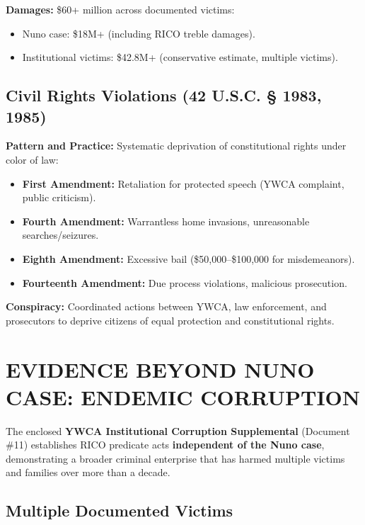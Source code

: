 \documentclass[12pt,oneside]{article}
\begin{document}
\begin{flushleft}
\textbf{Damages:} \$60+ million across documented victims:

\begin{itemize}
\item Nuno case: \$18M+ (including RICO treble damages).
\item Institutional victims: \$42.8M+ (conservative estimate, multiple victims).
\end{itemize}

\subsection*{Civil Rights Violations (42 U.S.C. § 1983, 1985)}

\textbf{Pattern and Practice:} Systematic deprivation of constitutional rights under color of law:

\begin{itemize}
\item \textbf{First Amendment:} Retaliation for protected speech (YWCA complaint, public criticism).
\item \textbf{Fourth Amendment:} Warrantless home invasions, unreasonable searches/seizures.
\item \textbf{Eighth Amendment:} Excessive bail (\$50,000--\$100,000 for misdemeanors).
\item \textbf{Fourteenth Amendment:} Due process violations, malicious prosecution.
\end{itemize}

\textbf{Conspiracy:} Coordinated actions between YWCA, law enforcement, and prosecutors to deprive citizens of equal protection and constitutional rights.

\section*{EVIDENCE BEYOND NUNO CASE: ENDEMIC CORRUPTION}

The enclosed \textbf{YWCA Institutional Corruption Supplemental} (Document \#11) establishes RICO predicate acts \textbf{independent of the Nuno case}, demonstrating a broader criminal enterprise that has harmed multiple victims and families over more than a decade.

\subsection*{Multiple Documented Victims}


\end{flushleft}
\end{document}
